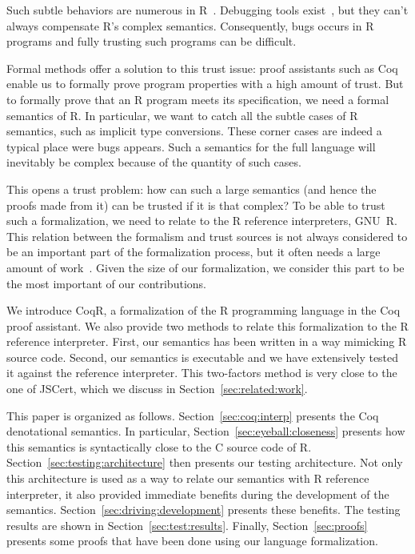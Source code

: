 \documentclass[
    sigplan,
    10pt,
    review, %
    natbib=false %
 ]{acmart}
\newcommand{\mb}[1]{\todo[color=purple!20,size=\scriptsize]{#1}}
\begin{document}
Such subtle behaviors are numerous in R~\parencite{RInferno}.
Debugging tools exist~\parencite{mcpherson2014},
but they can't always compensate R's complex semantics.
Consequently, bugs occurs in R programs
and fully trusting such programs can be difficult.

Formal methods offer a solution to this trust issue:
proof assistants such as Coq~\parencite{Coq} enable us
to formally prove program properties with a high amount of trust.
But to formally prove that an R program meets its specification,
we need a formal semantics of R.
In particular, we want to catch all the subtle cases of R semantics,
such as implicit type conversions.
These corner cases are indeed a typical place were bugs appears.
Such a semantics for the full language will inevitably be complex
because of the quantity of such cases.

This opens a trust problem:
how can such a large semantics (and hence the proofs made from it)
can be trusted if it is that complex?
To be able to trust such a formalization,
we need to relate to the R reference interpreters, GNU~R.
This relation between the formalism and trust sources
is not always considered to be an important part of the formalization process,
but it often needs a large amount of work~\parencite{leroy2014pip}.
Given the size of our formalization,
we consider this part to be the most important of our contributions.

We introduce CoqR\mb{Are we fixed on the name?},
a formalization of the R programming language in the Coq proof assistant.
We also provide two methods to relate this formalization
to the R reference interpreter.
First, our semantics has been written in a way mimicking R source code.
Second, our semantics is executable and we have extensively tested it
against the reference interpreter.
%
This two-factors method is very close to the one of JSCert,
which we discuss in Section~\ref{sec:related:work}.

This paper is organized as follows.
Section~\ref{sec:coq:interp} presents the Coq denotational semantics.
In particular, Section~\ref{sec:eyeball:closeness} presents
how this semantics is syntactically close to the C source code of R.
Section~\ref{sec:testing:architecture} then presents our testing architecture.
Not only this architecture is used as a way to relate our semantics
with R reference interpreter,
it also provided immediate benefits during the development of the semantics.
Section~\ref{sec:driving:development} presents these benefits.
The testing results are shown in Section~\ref{sec:test:results}.
Finally, Section~\ref{sec:proofs} presents some proofs that have been done
using our language formalization.
\end{document}
